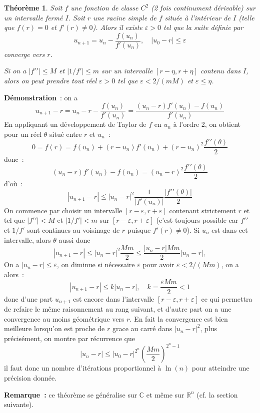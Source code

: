 \documentclass[a4paper,11pt]{article}
\newtheorem{thm}{Théorème}
\begin{document}
\begin{giacjshere}
\begin{thm} 
Soit $f$ une fonction de classe $C^2$ (2 fois continument dérivable)
sur un intervalle ferm\'e $I$. Soit $r$ une racine simple de $f$
situ\'ee \`a l'int\'erieur de $I$
(telle que $f(r)=0$ et $f'(r)\neq 0$). Alors il existe $\varepsilon>0$
tel que la suite définie par
\[ u_{n+1} = u_n -\frac{f(u_n)}{f'(u_n)}, \quad |u_0-r| \leq \varepsilon \]
converge vers $r$.

Si on a $|f'{'}| \leq M$ et $|1/f'| \leq m$ sur un intervalle 
$[r-\eta,r+\eta]$ contenu dans $I$, alors on peut prendre tout r\'eel
$\varepsilon>0$ tel que $\varepsilon < 2/(mM)$ et $\varepsilon \leq \eta$.
\end{thm}

{\bf Démonstration}~: on a
\[ u_{n+1}-r = u_n - r - \frac{f(u_n)}{f'(u_n)} = 
\frac{(u_n-r)f'(u_n)-f(u_n)}{f'(u_n)} \]
En appliquant un développement de Taylor de $f$ en $u_n$ à l'ordre 2,
on obtient pour un réel $\theta$
situé entre $r$ et $u_n$~:
\[ 0 = f(r)=f(u_n)+(r-u_n) f'(u_n) + (r-u_n)^2 \frac{f'{'}(\theta)}{2} \]
donc~:
\[ (u_n-r)f'(u_n)-f(u_n)= (u_n-r)^2 \frac{f'{'}(\theta)}{2} \]
d'o\`u~:
\[ |u_{n+1}-r| \leq |u_n-r|^2 \frac{1}{|f'(u_n)|} 
\frac{|f'{'}(\theta)|}{2} \]
On commence par choisir un intervalle $[r-\varepsilon,r+\varepsilon]$
contenant strictement $r$ et tel que $|f'{'}|<M$ et $|1/f'|<m$
sur $[r-\varepsilon,r+\varepsilon]$ (c'est toujours possible car
$f'{'}$ et $1/f'$ sont continues au voisinage de $r$ puisque $f'(r)\neq 0$).
Si $u_n$ est dans cet intervalle, alors $\theta$ aussi donc
\begin{equation}\label{eq:newton}
 |u_{n+1}-r| \leq |u_n-r|^2 \frac{Mm}{2} \leq  \frac{|u_n-r|Mm}{2}
|u_n-r|,  
\end{equation}
On a $|u_n-r| \leq \varepsilon$, on diminue si n\'ecessaire
$\varepsilon$ pour avoir $\varepsilon < 2/(Mm)$, on a alors~:
\[ |u_{n+1}-r| \leq k |u_n-r|, \quad k=\frac{\varepsilon Mm}{2}<1  \]
donc d'une part $u_{n+1}$ est encore dans l'intervalle 
$[r-\varepsilon,r+\varepsilon]$ 
ce qui permettra de refaire le m\^eme raisonnement au rang
suivant, et d'autre part
on a une convergence au moins géométrique vers $r$.
En fait la convergence est bien meilleure
lorsqu'on est proche de $r$ grace au carré dans $|u_n-r|^2$,
plus pr\'ecis\'ement, on montre par r\'ecurrence que
\[ |u_n-r| \leq |u_0 - r|^{2^n} \left( \frac{Mm}{2} \right)^{2^n-1}
\]
il faut donc un nombre d'it\'erations proportionnel \`a $\ln(n)$
pour atteindre une pr\'ecision donn\'ee.

{\bf Remarque~:} ce théorème se généralise sur $\mathbb{C}$ et même sur $\mathbb{R}^n$
(cf. la section suivante).


\end{giacjshere}
\end{document}
